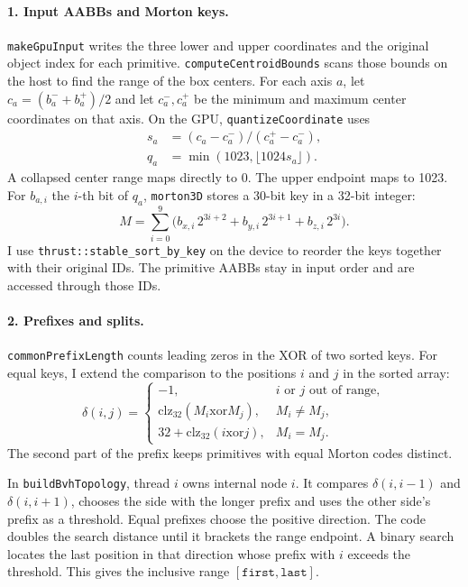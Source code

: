 \documentclass[acmtog]{acmart}
\begin{document}
\paragraph{1. Input AABBs and Morton keys.}
\texttt{makeGpuInput} writes the three lower and upper coordinates and the original object index for each primitive. \texttt{computeCentroidBounds} scans those bounds on the host to find the range of the box centers. For each axis $a$, let $c_a=(b_a^-+b_a^+)/2$ and let $c_a^-,c_a^+$ be the minimum and maximum center coordinates on that axis. On the GPU, \texttt{quantizeCoordinate} uses
\begin{equation}
\begin{aligned}
s_a&=(c_a-c_a^-)/(c_a^+-c_a^-),\\
q_a&=\min(1023,\lfloor1024s_a\rfloor).
\end{aligned}
\end{equation}
A collapsed center range maps directly to 0. The upper endpoint maps to 1023. For $b_{a,i}$ the $i$-th bit of $q_a$, \texttt{morton3D} stores a 30-bit key in a 32-bit integer:
\begin{equation}
M=\sum_{i=0}^{9}\bigl(b_{x,i}\,2^{3i+2}
                   +b_{y,i}\,2^{3i+1}
                   +b_{z,i}\,2^{3i}\bigr).
\end{equation}
I use \texttt{thrust::stable\_sort\_by\_key} on the device to reorder the keys together with their original IDs. The primitive AABBs stay in input order and are accessed through those IDs.

\paragraph{2. Prefixes and splits.}
\texttt{commonPrefixLength} counts leading zeros in the XOR of two sorted keys. For equal keys, I extend the comparison to the positions $i$ and $j$ in the sorted array:
\begin{equation}
\delta(i,j)=
\begin{cases}
-1,&i\text{ or }j\text{ out of range},\\
\mathrm{clz}_{32}(M_i\mathbin{\mathrm{xor}}M_j),&M_i\ne M_j,\\
32+\mathrm{clz}_{32}(i\mathbin{\mathrm{xor}}j),&M_i=M_j.
\end{cases}
\end{equation}
The second part of the prefix keeps primitives with equal Morton codes distinct.

In \texttt{buildBvhTopology}, thread $i$ owns internal node $i$. It compares $\delta(i,i-1)$ and $\delta(i,i+1)$, chooses the side with the longer prefix and uses the other side's prefix as a threshold. Equal prefixes choose the positive direction. The code doubles the search distance until it brackets the range endpoint. A binary search locates the last position in that direction whose prefix with $i$ exceeds the threshold. This gives the inclusive range $[\texttt{first},\texttt{last}]$.
\end{document}
